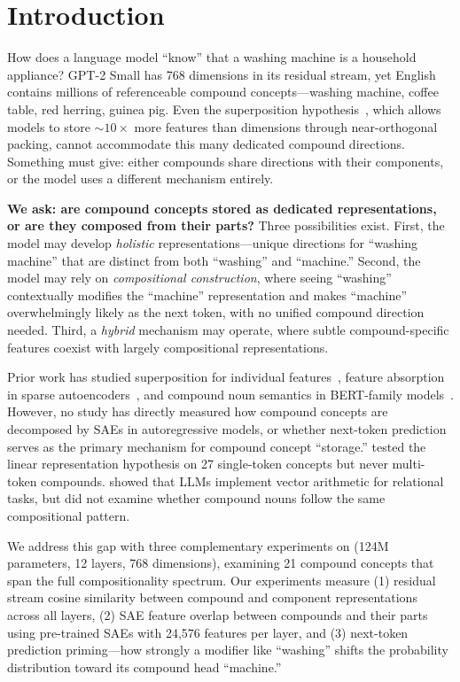 \section{Introduction}
\label{sec:introduction}

How does a language model ``know'' that a washing machine is a household appliance?
GPT-2 Small has 768 dimensions in its residual stream, yet English contains millions of referenceable compound concepts---washing machine, coffee table, red herring, guinea pig.
Even the superposition hypothesis~\citep{elhage2022superposition}, which allows models to store ${\sim}10\times$ more features than dimensions through near-orthogonal packing, cannot accommodate this many dedicated compound directions.
Something must give: either compounds share directions with their components, or the model uses a different mechanism entirely.

{\bf We ask: are compound concepts stored as dedicated representations, or are they composed from their parts?}
Three possibilities exist.
First, the model may develop \emph{holistic} representations---unique directions for ``washing machine'' that are distinct from both ``washing'' and ``machine.''
Second, the model may rely on \emph{compositional construction}, where seeing ``washing'' contextually modifies the ``machine'' representation and makes ``machine'' overwhelmingly likely as the next token, with no unified compound direction needed.
Third, a \emph{hybrid} mechanism may operate, where subtle compound-specific features coexist with largely compositional representations.

Prior work has studied superposition for individual features~\citep{elhage2022superposition}, feature absorption in sparse autoencoders~\citep{chanin2024absorption}, and compound noun semantics in BERT-family models~\citep{ormerod2024kitchen,miletic2023systematic}.
However, no study has directly measured how compound concepts are decomposed by SAEs in autoregressive models, or whether next-token prediction serves as the primary mechanism for compound concept ``storage.''
\citet{park2024linear} tested the linear representation hypothesis on 27 single-token concepts but never multi-token compounds.
\citet{merullo2023language} showed that LLMs implement vector arithmetic for relational tasks, but did not examine whether compound nouns follow the same compositional pattern.

We address this gap with three complementary experiments on \gpttwo (124M parameters, 12 layers, 768 dimensions), examining 21 compound concepts that span the full compositionality spectrum.
Our experiments measure (1) residual stream cosine similarity between compound and component representations across all layers, (2) SAE feature overlap between compounds and their parts using pre-trained SAEs with 24,576 features per layer, and (3) next-token prediction priming---how strongly a modifier like ``washing'' shifts the probability distribution toward its compound head ``machine.''

